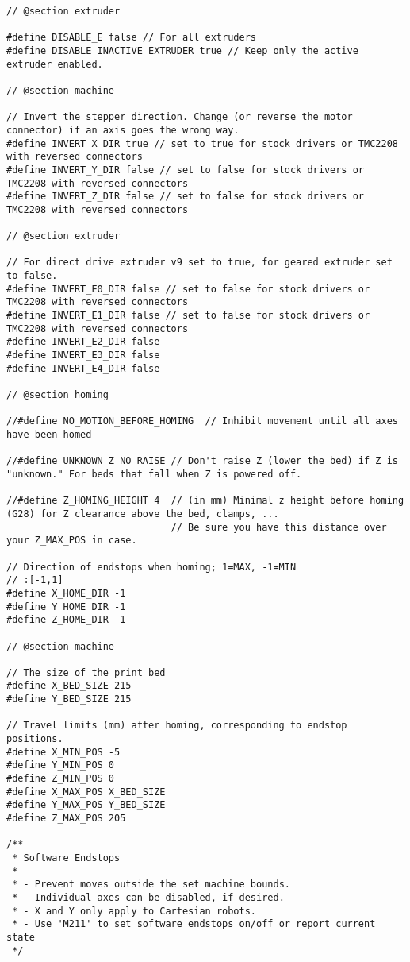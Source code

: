 \begin{lstlisting}[caption = キャプション, label = ラベル]
// @section extruder

#define DISABLE_E false // For all extruders
#define DISABLE_INACTIVE_EXTRUDER true // Keep only the active extruder enabled.

// @section machine

// Invert the stepper direction. Change (or reverse the motor connector) if an axis goes the wrong way.
#define INVERT_X_DIR true // set to true for stock drivers or TMC2208 with reversed connectors
#define INVERT_Y_DIR false // set to false for stock drivers or TMC2208 with reversed connectors
#define INVERT_Z_DIR false // set to false for stock drivers or TMC2208 with reversed connectors

// @section extruder

// For direct drive extruder v9 set to true, for geared extruder set to false.
#define INVERT_E0_DIR false // set to false for stock drivers or TMC2208 with reversed connectors
#define INVERT_E1_DIR false // set to false for stock drivers or TMC2208 with reversed connectors
#define INVERT_E2_DIR false
#define INVERT_E3_DIR false
#define INVERT_E4_DIR false

// @section homing

//#define NO_MOTION_BEFORE_HOMING  // Inhibit movement until all axes have been homed

//#define UNKNOWN_Z_NO_RAISE // Don't raise Z (lower the bed) if Z is "unknown." For beds that fall when Z is powered off.

//#define Z_HOMING_HEIGHT 4  // (in mm) Minimal z height before homing (G28) for Z clearance above the bed, clamps, ...
                             // Be sure you have this distance over your Z_MAX_POS in case.

// Direction of endstops when homing; 1=MAX, -1=MIN
// :[-1,1]
#define X_HOME_DIR -1
#define Y_HOME_DIR -1
#define Z_HOME_DIR -1

// @section machine

// The size of the print bed
#define X_BED_SIZE 215
#define Y_BED_SIZE 215

// Travel limits (mm) after homing, corresponding to endstop positions.
#define X_MIN_POS -5
#define Y_MIN_POS 0
#define Z_MIN_POS 0
#define X_MAX_POS X_BED_SIZE
#define Y_MAX_POS Y_BED_SIZE
#define Z_MAX_POS 205

/**
 * Software Endstops
 *
 * - Prevent moves outside the set machine bounds.
 * - Individual axes can be disabled, if desired.
 * - X and Y only apply to Cartesian robots.
 * - Use 'M211' to set software endstops on/off or report current state
 */


\end{lstlisting}
